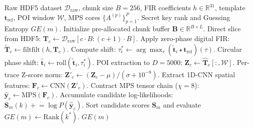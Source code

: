 \documentclass[letterpaper]{article}
\begin{document}
\begin{algorithm}[htbp]
\caption{Memory-Bounded Streaming Ingestion and Tensor Profiling}
\label{alg:streaming_pipeline}
\begin{algorithmic}[1]
\REQUIRE Raw HDF5 dataset $\mathcal{D}_{\text{raw}}$, chunk size $B=256$, FIR coefficients $h \in \mathbb{R}^{31}$, template $\mathbf{t}_{\text{ref}}$, POI window $\mathcal{W}$, MPS cores $\{A^{(p)}\}_{p=1}^P$.
\ENSURE Secret key rank and Guessing Entropy $GE(m)$.
\STATE Initialize pre-allocated chunk buffer $\mathbf{B} \in \mathbb{R}^{B \times L}$.
    \STATE Direct slice from HDF5: $\mathbf{T}_c \leftarrow \mathcal{D}_{\text{raw}}[c \cdot B : (c+1) \cdot B]$.
    \STATE Apply zero-phase digital FIR: $\tilde{\mathbf{T}}_c \leftarrow \text{filtfilt}(h, \mathbf{T}_c)$.
        \STATE Compute shift: $\tau^*_i \leftarrow \arg\max_\tau (\tilde{\mathbf{t}}_i \star \mathbf{t}_{\text{ref}})(\tau)$.
        \STATE Circular phase shift: $\hat{\mathbf{t}}_i \leftarrow \text{roll}(\tilde{\mathbf{t}}_i, \tau^*_i)$.
    \ENDFOR
    \STATE POI extraction to $D=5000$: $\mathbf{Z}_c \leftarrow \hat{\mathbf{T}}_c[:, \mathcal{W}]$.
    \STATE Per-trace Z-score norm: $\mathbf{Z}'_c \leftarrow (\mathbf{Z}_c - \mu) / (\sigma + 10^{-8})$.
    \STATE Extract 1D-CNN spatial features: $\mathbf{F}_c \leftarrow \text{CNN}(\mathbf{Z}'_c)$.
    \STATE Contract MPS tensor chain ($\chi=8$): $\hat{\mathbf{y}}_c \leftarrow \text{MPS}(\mathbf{F}_c)$.
    \STATE Accumulate candidate log-likelihoods: $\mathbf{S}_m(k) \mathrel{+}= \log P(\hat{\mathbf{y}}_c)$.
\ENDFOR
\STATE Sort candidate scores $\mathbf{S}_m$ and evaluate $GE(m) \leftarrow \text{Rank}(k^*)$.
\RETURN $GE(m)$
\end{algorithmic}
\end{algorithm}
\end{document}
